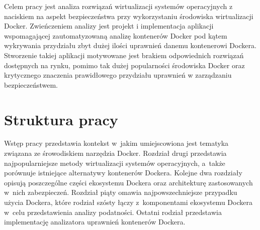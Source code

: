 Celem pracy jest analiza rozwiązań wirtualizacji systemów operacyjnych z naciskiem na aspekt bezpieczeństwa przy wykorzystaniu środowiska wirtualizacji Docker. Zwieńczeniem analizy jest projekt i implementacja aplikacji wspomagającej zautomatyzowaną analizę kontenerów Docker pod kątem wykrywania przydziału zbyt dużej ilości uprawnień danemu kontenerowi Dockera. Stworzenie takiej aplikacji motywowane jest brakiem odpowiednich rozwiązań dostępnych na rynku, pomimo tak dużej popularności środowiska Docker oraz krytycznego znaczenia prawidłowego przydziału uprawnień w zarządzaniu bezpieczeństwem.

\section{Struktura pracy}

Wstęp pracy przedstawia kontekst w~jakim umiejscowiona jest tematyka związana ze śrowodiskiem narzędzia Docker. Rozdział drugi przedstawia najpopularniejsze metody wirtualizacji systemów operacyjnych, a~także porównuje istniejące alternatywy kontenerów Dockera. Kolejne dwa rozdziały opisują poszczególne części ekosystemu Dockera oraz architekturę zastosowanych w~nich zabezpieczeń. Rozdział piąty omawia najpowszechniejsze przypadku użycia Dockera, które rodział szósty łączy z~komponentami ekosystemu Dockera w~celu przedstawienia analizy podatności. Ostatni rodział przedstawia implementację analizatora uprawnień kontenerów Dockera.
